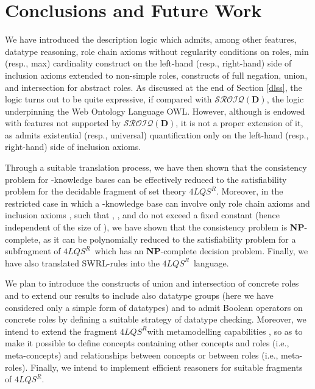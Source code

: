 \documentclass[a4paper]{llncs}
\newcommand{\sroiqd}{\ensuremath{\mathcal{SROIQ}(\D)}}
\newcommand{\flqsr}{\ensuremath{4LQS^R}}
\newcommand{\D}{\mathbf{D}}
\begin{document}
\section{Conclusions and Future Work}\label{conclusions}
We have introduced the description logic  which admits, among other features, datatype reasoning, role chain axioms without regularity conditions on roles, min (resp., max) cardinality construct on the left-hand (resp., right-hand) side of inclusion axioms extended to non-simple roles, constructs of full negation, union, and intersection for abstract roles. As discussed at the end of Section \ref{dlss}, the logic  turns out to be quite expressive, if compared with \sroiqd, the logic underpinning the Web Ontology Language OWL.
However, although  is endowed with features not supported by \sroiqd, it is not a proper extension of it, as  admits existential (resp., universal) quantification only on the left-hand (resp., right-hand) side of inclusion axioms.

Through a suitable translation process, we have then shown that the consistency problem for -knowledge bases can be effectively reduced to the satisfiability problem for the decidable fragment of set theory \flqsr. Moreover, in the restricted case in which a -knowledge base  can involve only role chain axioms  and inclusion axioms ,  such that , , and  do not exceed a fixed constant (hence independent of the size of ), we have shown that the consistency problem is \textbf{NP}-complete, as it can be polynomially reduced to the satisfiability problem for a subfragment of \flqsr\ which has an \textbf{NP}-complete decision problem.  Finally, we have also translated SWRL-rules into the \flqsr\ language.




We plan to introduce the constructs of union and intersection of concrete roles and to extend our results to include also datatype groups (here we have considered only a simple form of datatypes) and to admit Boolean operators on concrete roles by defining a suitable strategy of datatype checking. Moreover, we intend to extend the fragment \flqsr\space with metamodelling capabilities \cite{Motik05,GlimmRV10,HomolaKSV14}, so as to make it possible to define concepts containing other concepts and roles (i.e., meta-concepts) and relationships between concepts or between roles (i.e., meta-roles).
Finally, we intend to implement efficient reasoners for suitable fragments of
\flqsr.



 
\end{document}
